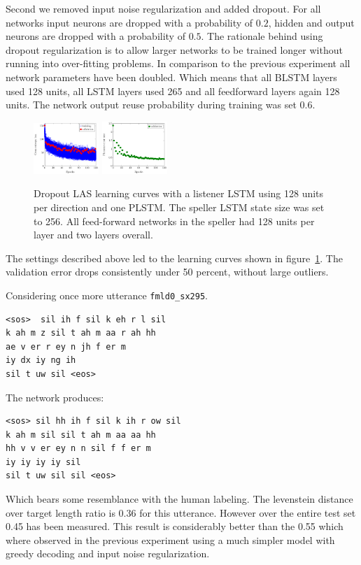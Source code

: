 \documentclass{article}
\begin{document}
Second we removed input noise regularization and added dropout. For all networks input neurons are dropped with a probability of $0.2$, hidden and output neurons are dropped with a probability of $0.5$. The rationale behind using dropout regularization is to allow larger networks to be trained longer without running into over-fitting problems. In comparison to the previous experiment all network parameters have been doubled. Which means that all BLSTM layers used 128 units, all LSTM layers used 265 and all feedforward layers again 128 units. The network output reuse probability during training was set 0.6. 
\begin{figure}
\centering
\includegraphics[width=0.22\textwidth]{../tikz/LAS_dropout0805_in00_p06_e120_double_loss.pdf}
\includegraphics[width=0.22\textwidth]{../tikz/LAS_dropout0805_in00_p06_e120_double_error.pdf}
\caption{Dropout LAS learning curves with a listener LSTM using 128 units per direction and one PLSTM. The speller LSTM state size was set to 256. All feed-forward networks in the speller had 128 units per layer and two layers overall.}
\label{fig:dropBeamRes}
\end{figure}
The settings described above led to the learning curves shown in figure~\ref{fig:dropBeamRes}. The validation error drops consistently under 50 percent, without large outliers. 

Considering once more utterance \texttt{fmld0\_sx295}.
\begin{lstlisting}[caption={Targets}]
<sos>  sil ih f sil k eh r l sil
k ah m z sil t ah m aa r ah hh
ae v er r ey n jh f er m
iy dx iy ng ih  
sil t uw sil <eos>
\end{lstlisting}
The network produces:
\begin{lstlisting}[caption={Network output}]
<sos> sil hh ih f sil k ih r ow sil
k ah m sil sil t ah m aa aa hh
hh v v er ey n n sil f f er m
iy iy iy iy sil
sil t uw sil sil <eos>
\end{lstlisting}
Which bears some resemblance with the human labeling. The levenstein distance over target length ratio is 0.36 for this utterance. However over the entire test set 0.45 has been measured. This result is considerably better than the 0.55 which where observed in the previous experiment using a much simpler model with greedy decoding and input noise regularization.
\end{document}
